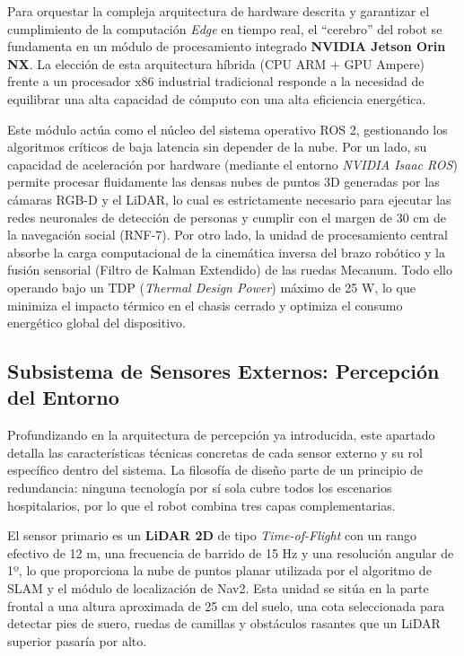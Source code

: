 
Para orquestar la compleja arquitectura de hardware descrita y garantizar el cumplimiento de la computación \textit{Edge} en tiempo real, el ``cerebro'' del robot se fundamenta en un módulo de procesamiento integrado \textbf{NVIDIA Jetson Orin NX}. La elección de esta arquitectura híbrida (CPU ARM + GPU Ampere) frente a un procesador x86 industrial tradicional responde a la necesidad de equilibrar una alta capacidad de cómputo con una alta eficiencia energética.

Este módulo actúa como el núcleo del sistema operativo ROS 2, gestionando los algoritmos críticos de baja latencia sin depender de la nube. Por un lado, su capacidad de aceleración por hardware (mediante el entorno \textit{NVIDIA Isaac ROS}) permite procesar fluidamente las densas nubes de puntos 3D generadas por las cámaras RGB-D y el LiDAR, lo cual es estrictamente necesario para ejecutar las redes neuronales de detección de personas y cumplir con el margen de 30 cm de la navegación social (RNF-7). Por otro lado, la unidad de procesamiento central absorbe la carga computacional de la cinemática inversa del brazo robótico y la fusión sensorial (Filtro de Kalman Extendido) de las ruedas Mecanum. Todo ello operando bajo un TDP (\textit{Thermal Design Power}) máximo de 25 W, lo que minimiza el impacto térmico en el chasis cerrado y optimiza el consumo energético global del dispositivo.

\subsection*{Subsistema de Sensores Externos: Percepción del Entorno}
Profundizando en la arquitectura de percepción ya introducida, este apartado detalla las características técnicas concretas de cada sensor externo y su rol específico dentro del sistema. La filosofía de diseño parte de un principio de redundancia: ninguna tecnología por sí sola cubre todos los escenarios hospitalarios, por lo que el robot combina tres capas complementarias.

El sensor primario es un \textbf{LiDAR 2D} de tipo \textit{Time-of-Flight} con un rango efectivo de 12 m, una frecuencia de barrido de 15 Hz y una resolución angular de 1º, lo que proporciona la nube de puntos planar utilizada por el algoritmo de SLAM y el módulo de localización de Nav2. Esta unidad se sitúa en la parte frontal a una altura aproximada de 25 cm del suelo, una cota seleccionada para detectar pies de suero, ruedas de camillas y obstáculos rasantes que un LiDAR superior pasaría por alto.

